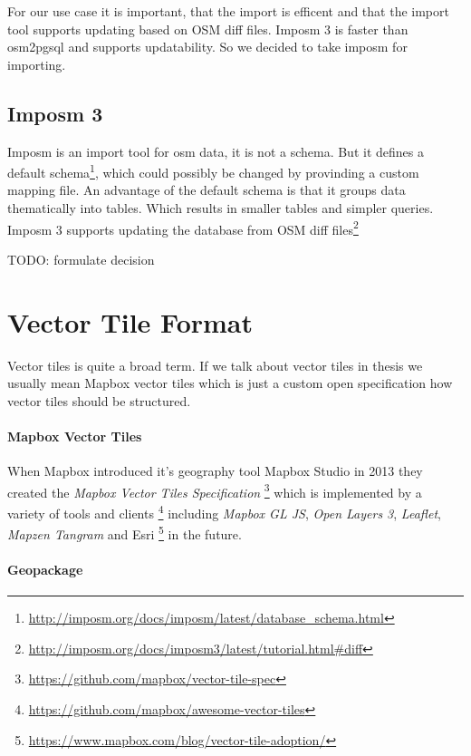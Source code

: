 For our use case it is important, that the import is efficent and that
the import tool supports updating based on OSM diff files. Imposm 3 is
faster than osm2pgsql and supports updatability. So we decided to take
imposm for importing.

\subsection{Imposm 3 }\label{imposm-importer}

Imposm is an import tool for osm data, it is not a schema. But it
defines a default
schema\footnote{\url{http://imposm.org/docs/imposm/latest/database_schema.html}},
which could possibly be changed by provinding a custom mapping file. An
advantage of the default schema is that it groups data thematically into
tables. Which results in smaller tables and simpler queries. Imposm 3
supports updating the database from OSM diff
files\footnote{\url{http://imposm.org/docs/imposm3/latest/tutorial.html\#diff}}

TODO: formulate decision

\section{Vector Tile Format}\label{vector-tile-formats}

Vector tiles is quite a broad term. If we talk about vector tiles in thesis we usually mean Mapbox vector tiles which is just a custom open specification how vector tiles should be structured.

\paragraph{Mapbox Vector Tiles}

When Mapbox introduced it's geography tool Mapbox Studio in 2013 they
created the \emph{Mapbox Vector Tiles Specification}
\footnote{\url{https://github.com/mapbox/vector-tile-spec}} which is
implemented by a variety of tools and clients
\footnote{\url{https://github.com/mapbox/awesome-vector-tiles}}
including \emph{Mapbox GL JS}, \emph{Open Layers 3}, \emph{Leaflet},
\emph{Mapzen Tangram} and Esri
\footnote{\url{https://www.mapbox.com/blog/vector-tile-adoption/}} in
the future.

\paragraph{Geopackage}

